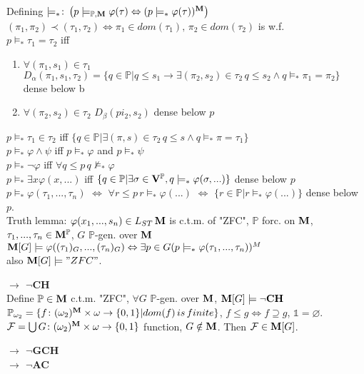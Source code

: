 \documentclass[9pt]{article}
\newcommand{\class}[1]{{\bf #1}}
\newcommand{\Pp}{\mathbb{P}}
\newcommand{\mytitle}[1]{ {\bf $\rightarrow$ #1}\\}
\newcommand{\V}{\class{V}}
\begin{document}
\begin{multicols*}{2}
Defining $\models_*\colon \left(p\models_{\Pp,\class{M}}\varphi(\tau)\Leftrightarrow (p\models_*\varphi(\tau))^\class{M}\right)$\\
$(\pi_1,\pi_2)\prec (\tau_1,\tau_2)\Leftrightarrow \pi_1\in dom(\tau_1),\,\pi_2\in dom(\tau_2)$ is w.f.\\
$p\models_*\tau_1=\tau_2$ iff\begin{enumerate}
	\item $\forall (\pi_1,s_1)\in\tau_1$ $D_\alpha(\pi_1,s_1,\tau_2)=\{q\in\Pp|q\leqslant s_1\to \exists(\pi_2,s_2)\in\tau_2\,q\leqslant s_2\wedge q\models_*\pi_1=\pi_2\}$ dense below b
	\item $\forall(\pi_2,s_2)\in\tau_2$ $D_\beta(pi_2,s_2)$ dense below $p$
\end{enumerate}
$p\models_*\tau_1\in\tau_2$ iff $\{q\in \Pp|\exists (\pi,s)\in\tau_2\,q\leqslant s\wedge q\models_* \pi=\tau_1\}$\\
$p\models_*\varphi\wedge\psi$ iff $p\models_*\varphi$ and $p\models_*\psi$\\
$p\models_*\neg\varphi$ iff $\forall q\leqslant p\,q\not\models_*\varphi$\\
$p\models_*\exists x\varphi(x,...)$ iff $\{q\in \Pp|\exists \sigma\in\V^\Pp,q\models_*\varphi(\sigma,...)\}$ dense below $p$\\
$p\models_*\varphi(\tau_1,...,\tau_n)$ $\Leftrightarrow$ $\forall r\leqslant p\,r\models_*\varphi(...)$ $\Leftrightarrow$ $\{r\in\Pp|r\models_*\varphi(...)\}$ dense below $p$.\\
Truth lemma: $\varphi(x_1,...,s_n)\in L_{ST}\,\class{M}$ is c.t.m. of "ZFC", $\Pp$ forc. on $\class{M}$, $\tau_1,...,\tau_n\in\class{M}^\Pp$, $G$ $\Pp$-gen. over $\class{M}$ $\class{M}[G]\models \varphi((\tau_1)_G,...,(\tau_n)_G)\Leftrightarrow\exists p\in G(p\models_*\varphi(\tau_1,...,\tau_n))^M$\\
also $\class{M}[G]\models "ZFC"$.

\mytitle{$\neg$CH}
Define $\Pp\in\class{M}$ c.t.m. "ZFC", $\forall G$ $\Pp$-gen. over $\class{M}$, $\class{M}[G]\models\neg\class{CH}$\\
$\Pp_{\omega_2}=\{f\colon (\omega_2)^\class{M}\times\omega\to\{0,1\}|dom(f)\,is\,finite\}$, $f\leqslant g\Leftrightarrow f\supseteq g$, $\mathbb{1}=\varnothing$.
$\mathcal{F}=\bigcup G\colon (\omega_2)^\class{M}\times\omega\to\{0,1\}$ function, $G\notin\class{M}$. Then $\mathcal{F}\in\class{M}[G]$.

\mytitle{$\neg$\class{GCH}}

\mytitle{$\neg$\class{AC}}
\end{multicols*}
\end{document}
